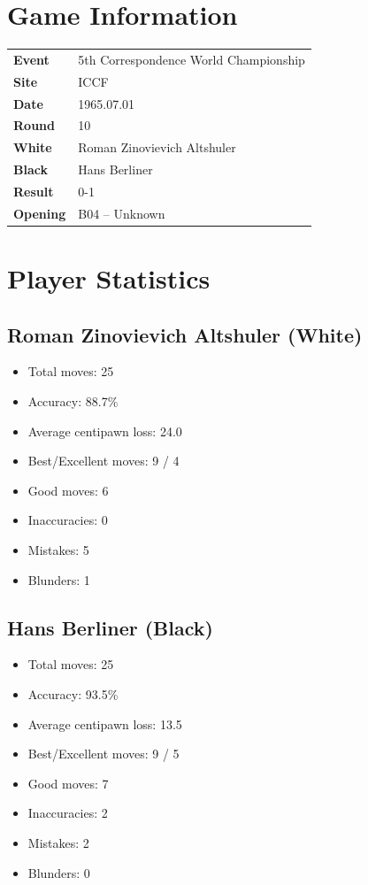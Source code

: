 \documentclass[11pt]{book}
\begin{document}
\section{Game Information}
\begin{tabular}{ll}
\textbf{Event} & 5th Correspondence World Championship \\
\textbf{Site} & ICCF \\
\textbf{Date} & 1965.07.01 \\
\textbf{Round} & 10 \\
\textbf{White} & Roman Zinovievich Altshuler \\
\textbf{Black} & Hans Berliner \\
\textbf{Result} & 0-1 \\
\textbf{Opening} & B04 -- Unknown \\
\end{tabular}

\section{Player Statistics}

\subsection{Roman Zinovievich Altshuler (White)}
\begin{itemize}
\item Total moves: 25
\item Accuracy: 88.7\%
\item Average centipawn loss: 24.0
\item Best/Excellent moves: 9 / 4
\item Good moves: 6
\item Inaccuracies: 0
\item Mistakes: 5
\item Blunders: 1
\end{itemize}

\subsection{Hans Berliner (Black)}
\begin{itemize}
\item Total moves: 25
\item Accuracy: 93.5\%
\item Average centipawn loss: 13.5
\item Best/Excellent moves: 9 / 5
\item Good moves: 7
\item Inaccuracies: 2
\item Mistakes: 2
\item Blunders: 0
\end{itemize}
\end{document}
